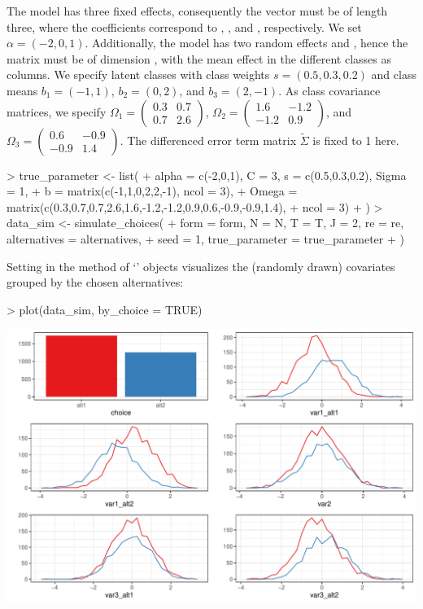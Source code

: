 \documentclass[article,shortnames]{jss}
\newcommand{\class}[1]{`\code{#1}'}
\newcommand{\fct}[1]{\code{#1()}}
\begin{document}
The model has three fixed effects, consequently the vector  must be of length three, where the coefficients correspond to , , and , respectively. We set $\alpha = (-2,0,1)$. Additionally, the model has two random effects  and , hence the matrix  must be of dimension , with the mean effect in the different classes as columns. We specify  latent classes with class weights $s = (0.5,0.3,0.2)$ and class means $b_1 = (-1,1)$, $b_2 = (0,2)$, and $b_3 = (2,-1)$. As class covariance matrices, we specify $\Omega_1 = \begin{pmatrix} 0.3 & 0.7 \\ 0.7 & 2.6 \end{pmatrix}$, $\Omega_2 = \begin{pmatrix} 1.6 & -1.2 \\ -1.2 & 0.9 \end{pmatrix}$, and $\Omega_3 = \begin{pmatrix} 0.6 & -0.9 \\ -0.9 & 1.4 \end{pmatrix}$. The differenced error term matrix $\tilde{\Sigma}$ is fixed to 1 here.

\begin{Schunk}
\begin{Sinput}
> true_parameter <- list(
+    alpha = c(-2,0,1), C = 3, s = c(0.5,0.3,0.2), Sigma = 1,
+    b = matrix(c(-1,1,0,2,2,-1), ncol = 3),
+    Omega = matrix(c(0.3,0.7,0.7,2.6,1.6,-1.2,-1.2,0.9,0.6,-0.9,-0.9,1.4),
+                   ncol = 3)
+  )
> data_sim <- simulate_choices(
+    form = form, N = N, T = T, J = 2, re = re, alternatives = alternatives,
+    seed = 1, true_parameter = true_parameter
+  )
\end{Sinput}
\end{Schunk}

Setting  in the \fct{plot} method of \class{RprobitB\_data} objects visualizes the (randomly drawn) covariates grouped by the chosen alternatives:

\begin{Schunk}
\begin{Sinput}
> plot(data_sim, by_choice = TRUE)
\end{Sinput}
\end{Schunk}
\includegraphics{rprobitb_oelschlaeger_bauer-sim-data}
\end{document}
